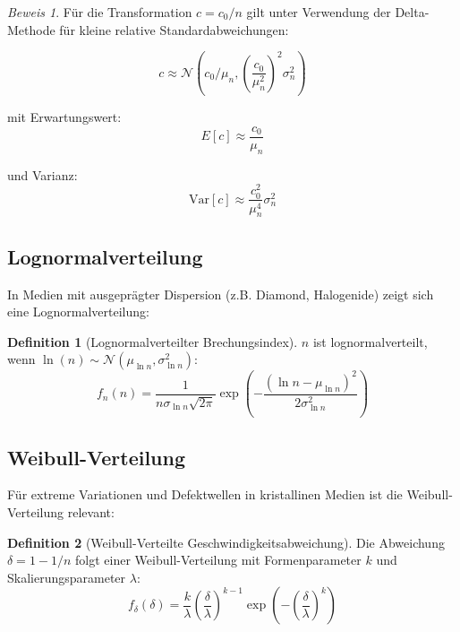 \documentclass[a4paper,12pt]{article}
\theoremstyle{definition}
\newtheorem{definition}{Definition}[section]
\theoremstyle{remark}
\newtheorem*{beweis}{Beweis}
\newcommand{\cLight}{c}
\newcommand{\refIndex}{n}
\begin{document}
\begin{beweis}
Für die Transformation $\cLight = \cLight_0 / \refIndex$ gilt unter Verwendung der Delta-Methode für kleine relative Standardabweichungen:

\begin{equation}
    \cLight \approx \mathcal{N}\left(\cLight_0 / \mu_n, \left(\frac{\cLight_0}{\mu_n^2}\right)^2 \sigma_n^2\right)
\end{equation}

mit Erwartungswert:
\begin{equation}
    E[\cLight] \approx \frac{\cLight_0}{\mu_n}
\end{equation}

und Varianz:
\begin{equation}
    \text{Var}[\cLight] \approx \frac{\cLight_0^2}{\mu_n^4} \sigma_n^2
\end{equation}
\end{beweis}

\subsection{Lognormalverteilung}

In Medien mit ausgeprägter Dispersion (z.B. Diamond, Halogenide) zeigt sich eine Lognormalverteilung:

\begin{definition}[Lognormalverteilter Brechungsindex]
$\refIndex$ ist lognormalverteilt, wenn $\ln(\refIndex) \sim \mathcal{N}(\mu_{\ln n}, \sigma_{\ln n}^2)$:
\begin{equation}
    f_{\refIndex}(n) = \frac{1}{n \sigma_{\ln n} \sqrt{2\pi}} \exp\left(-\frac{(\ln n - \mu_{\ln n})^2}{2\sigma_{\ln n}^2}\right)
\end{equation}
\end{definition}

\subsection{Weibull-Verteilung}

Für extreme Variationen und Defektwellen in kristallinen Medien ist die Weibull-Verteilung relevant:

\begin{definition}[Weibull-Verteilte Geschwindigkeitsabweichung]
Die Abweichung $\delta = 1 - 1/\refIndex$ folgt einer Weibull-Verteilung mit Formenparameter $k$ und Skalierungsparameter $\lambda$:
\begin{equation}
    f_{\delta}(\delta) = \frac{k}{\lambda}\left(\frac{\delta}{\lambda}\right)^{k-1} \exp\left(-\left(\frac{\delta}{\lambda}\right)^k\right)
\end{equation}
\end{definition}
\end{document}

